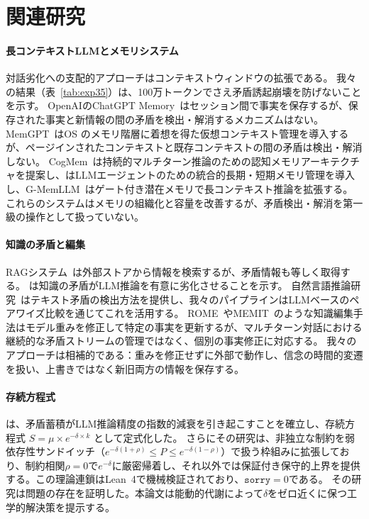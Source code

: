 \documentclass[11pt,a4paper]{article}
\begin{document}
\section{関連研究}
\label{sec:related}

\paragraph{長コンテキストLLMとメモリシステム}
対話劣化への支配的アプローチはコンテキストウィンドウの拡張である。
我々の結果（表~\ref{tab:exp35}）は、100万トークンでさえ矛盾誘起崩壊を防げないことを示す。
OpenAIのChatGPT Memory~\citep{openai2024memory}はセッション間で事実を保存するが、保存された事実と新情報の間の矛盾を検出・解消するメカニズムはない。
MemGPT~\citep{packer2023memgpt}はOS のメモリ階層に着想を得た仮想コンテキスト管理を導入するが、ページインされたコンテキストと既存コンテキストの間の矛盾は検出・解消しない。
CogMem~\citep{cogmem2025}は持続的マルチターン推論のための認知メモリアーキテクチャを提案し、\citet{agenticmem2026}はLLMエージェントのための統合的長期・短期メモリ管理を導入し、G-MemLLM~\citep{gmemllm2026}はゲート付き潜在メモリで長コンテキスト推論を拡張する。
これらのシステムはメモリの組織化と容量を改善するが、矛盾検出・解消を第一級の操作として扱っていない。

\paragraph{知識の矛盾と編集}
RAGシステム~\citep{lewis2020rag}は外部ストアから情報を検索するが、矛盾情報も等しく取得する。
\citet{xie2024knowledge}は知識の矛盾がLLM推論を有意に劣化させることを示す。
自然言語推論研究~\citep{bowman2015snli,williams2018multinli}はテキスト矛盾の検出方法を提供し、我々のパイプラインはLLMベースのペアワイズ比較を通じてこれを活用する。
ROME~\citep{meng2022rome}やMEMIT~\citep{meng2023memit}のような知識編集手法はモデル重みを修正して特定の事実を更新するが、マルチターン対話における継続的な矛盾ストリームの管理ではなく、個別の事実修正に対応する。
我々のアプローチは相補的である：重みを修正せずに外部で動作し、信念の時間的変遷を扱い、上書きではなく新旧両方の情報を保存する。

\paragraph{存続方程式}
\citet{sunagawa2026collapse}は、矛盾蓄積がLLM推論精度の指数的減衰を引き起こすことを確立し、存続方程式 $S = \mu \times e^{-\delta \times k}$ として定式化した。
さらにその研究は、非独立な制約を弱依存性サンドイッチ（$e^{-\delta(1+\rho)} \leq P \leq e^{-\delta(1-\rho)}$）で扱う枠組みに拡張しており、制約相関$\rho = 0$で$e^{-\delta}$に厳密帰着し、それ以外では保証付き保守的上界を提供する。この理論連鎖はLean~4で機械検証されており、$\texttt{sorry} = 0$である。
その研究は問題の存在を証明した。本論文は能動的代謝によって$\delta$をゼロ近くに保つ工学的解決策を提示する。
\end{document}

